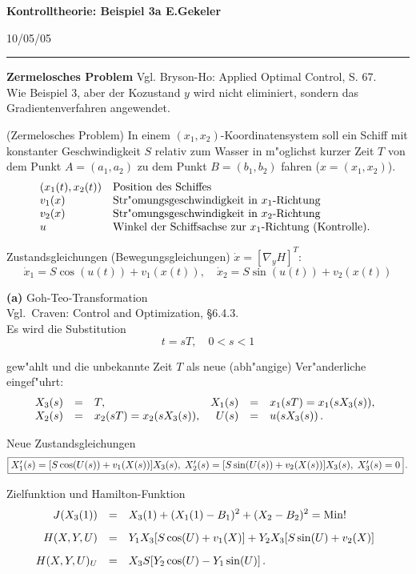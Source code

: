 \documentclass[12pt,a4paper,twoside,leqno]{article}
\newcommand{\Release}{10/05/05} %
\begin{document}
{\large\bf Kontrolltheorie: Beispiel 3a \hfill E.Gekeler}
\par
\vspace{-0.5ex}
\hfill{\footnotesize\Release\ }
\par\hrule\par\vspace{2ex}
{\bf Zermelosches Problem}
Vgl. {\sc Bryson-Ho}: Applied Optimal Control, S. 67.\\
Wie Beispiel 3, aber der Kozustand $y$ wird nicht eliminiert,
sondern das Gradientenverfahren angewendet.

({\sc Zermelo}sches Problem) In einem
$(x_1,x_2)$-Koordinatensystem soll ein Schiff mit konstanter Geschwindigkeit
$S$ relativ zum Wasser in m"oglichst kurzer Zeit $T$ von dem Punkt $A =
(a_1,a_2)$ zu dem Punkt $B = (b_1,b_2)$ fahren ($x = (x_1,x_2)$).
\[
\ba{.}{ll}
(x_1(t),x_2(t))  & \mbox{Position des Schiffes}\\
v_1(x) & \mbox{Str"omungsgeschwindigkeit in $x_1$-Richtung}\\
v_2(x) & \mbox{Str"omungsgeschwindigkeit in $x_2$-Richtung}\\
u & \mbox{Winkel der Schiffsachse zur $x_1$-Richtung (Kontrolle)}.
\ea{.}
\]

Zustandsgleichungen (Bewegungsgleichungen) $\dot{x} = [\nabla_y H]^T$:
%
\[
\dot{x}_1 = S \cos(u(t)) + v_1(x(t)),\quad
\dot{x}_2 = S \sin(u(t)) + v_2(x(t))
\]

{\bf (a)} {\sc Goh-Teo}-Transformation\\
Vgl.\ {\sc Craven}: Control and Optimization, \S 6.4.3.\\
Es wird die Substitution
\[
t = sT, \quad 0 < s < 1
\]
\par
\vspace{1mm}

gew"ahlt und die unbekannte Zeit $T$ als neue (abh"angige) Ver"anderliche
eingef"uhrt:
\[
\ba{.}{rclrcl}
X_3(s) &=& T, &
X_1(s) &=& x_1(sT) = x_1(sX_3(s)), \\
X_2(s) &=& x_2(sT) = x_2(sX_3(s)), &
U(s) &=& u(sX_3(s))\,.
\ea{.}
\]
\par
Neue Zustandsgleichungen
\[
\fbox{$
X'_1(s) = [S \cos(U(s)) + v_1(X(s))]X_3(s),\;
X'_2(s) = [S \sin(U(s)) + v_2(X(s))]X_3(s), \;
X'_3(s) = 0
$}\,.
\]

Zielfunktion und {\sc Hamilton}-Funktion
\[
\ba{.}{rcl}
J(X_3(1)) &=& \dis X_3(1) + (X_1(1) - B_1)^2 + (X_2 - B_2)^2 = \Min!\\[3mm]
H(X,Y,U) &=& \dis
Y_1X_3[S\cos(U) + v_1(X)] + Y_2X_3[S\sin(U) + v_2(X)]\\[3mm]
H(X,Y,U)_U &=& \dis
X_3S[Y_2\cos(U) - Y_1\sin(U)]\, .
\ea{.}
\]
\end{document}
